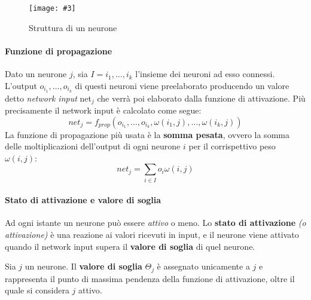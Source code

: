 \documentclass[12pt, twoside, letterpaper]{report}
\newcommand{\img}[4] {
	\begin{figure}
		\centering
		\texttt{[image: \#3]}\\
		\caption{#1}
		\label{#4}
	\end{figure}
}
\begin{document}
			\img{Struttura di un neurone \cite{kriesel}}{0.4}{neurone.png}{neurone} 
			
			 \paragraph{Funzione di propagazione} Dato un neurone $j$, sia $I = i_1, \dots, i_k$ l'insieme dei neuroni ad esso connessi. L'output $o_{i_1}, \dots, o_{i_k}$ di questi neuroni viene preelaborato producendo un valore detto \textit{network input} net$_j$  che verrà poi elaborato dalla funzione di attivazione. Più precisamente il network input è calcolato come segue: $$net_j = f_{prop}(o_{i_1}, \dots, o_{i_k}, \omega(i_1,j), \dots, \omega(i_k,j))$$
			 	La funzione di propagazione più usata è la \textbf{somma pesata}, ovvero la somma delle moltiplicazioni dell'output di ogni neurone $i$ per il corrispettivo peso $\omega(i,j)$: $$net_j = \sum_{i \in I} o_i \omega(i,j)$$
			 	
			 \paragraph{Stato di attivazione e valore di soglia} Ad ogni istante un neurone può essere \textit{attivo} o meno. Lo \textbf{stato di attivazione} \textit{(o attivazione)} è una reazione ai valori ricevuti in input, e il neurone viene attivato quando il network input supera il \textbf{valore di soglia} di quel neurone. 
			 
			 Sia $j$ un neurone. Il \textbf{valore di soglia} $\Theta_j$ è assegnato unicamente a $j$ e rappresenta il punto di massima pendenza della funzione di attivazione, oltre il quale si considera $j$ attivo.
			 
			 
\end{document}
